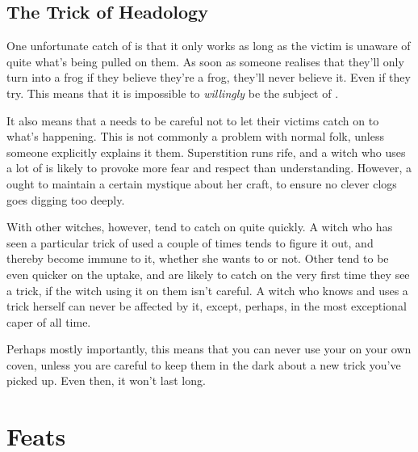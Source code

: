 \subsection{The Trick of Headology}

One unfortunate catch of  is that it only works as long as the victim is unaware of quite what's being pulled on them.
As soon as someone realises that they'll only turn into a frog if they believe they're a frog, they'll never believe it.
Even if they try.
This means that it is impossible to \emph{willingly} be the subject of .

It also means that a  needs to be careful not to let their victims catch on to what's happening.
This is not commonly a problem with normal folk, unless someone explicitly explains it them.
Superstition runs rife, and a witch who uses a lot of  is likely to provoke more fear and respect than understanding.
However, a  ought to maintain a certain mystique about her craft, to ensure no clever clogs goes digging too deeply.

With other witches, however, tend to catch on quite quickly.
A witch who has seen a particular trick of  used a couple of times tends to figure it out, and thereby become immune to it, whether she wants to or not.
Other  tend to be even quicker on the uptake, and are likely to catch on the very first time they see a trick, if the witch using it on them isn't careful.
A witch who knows and uses a trick herself can never be affected by it, except, perhaps, in the most exceptional caper of all time.

Perhaps mostly importantly, this means that you can never use your  on your own coven, unless you are careful to keep them in the dark about a new trick you've picked up.
Even then, it won't last long.

\section{Feats}


